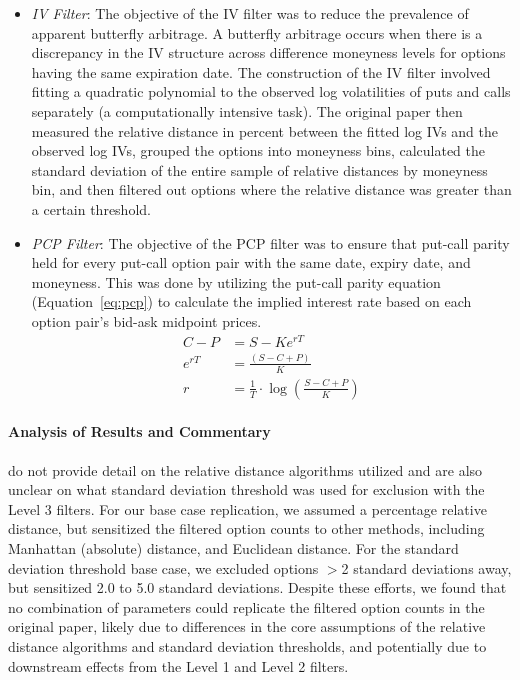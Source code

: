 \begin{itemize}
  \item \textit{IV Filter}: The objective of the IV filter was to reduce the prevalence of apparent butterfly arbitrage. A butterfly arbitrage occurs when there is a discrepancy in the IV structure across difference moneyness levels for options having the same expiration date. The construction of the IV filter involved fitting a quadratic polynomial to the observed log volatilities of puts and calls separately (a computationally intensive task). The original paper then measured the relative distance in percent between the fitted log IVs and the observed log IVs, grouped the options into moneyness bins, calculated the standard deviation of the entire sample of relative distances by moneyness bin, and then filtered out options where the relative distance was greater than a certain threshold.
  \item \textit{PCP Filter}: The objective of the PCP filter was to ensure that put-call parity held for every put-call option pair with the same date, expiry date, and moneyness. This was done by utilizing the put-call parity equation (Equation~\ref{eq:pcp}) to calculate the implied interest rate based on each option pair's bid-ask midpoint prices.
\begin{align}
  \label{eq:pcp}
  C-P &= S-Ke^{rT} \\
  e^{rT} &= \frac{(S-C+P)}{K} \\
  r &= \frac{1}{T} \cdot \log\left(\frac{S-C+P}{K}\right)
\end{align}
\end{itemize}


\paragraph{Analysis of Results and Commentary}
\citet{constantinides2013} do not provide detail on the relative distance algorithms utilized and are also unclear on what standard deviation threshold was used for exclusion with the Level 3 filters. For our base case replication, we assumed a percentage relative distance, but sensitized the filtered option counts to other methods, including Manhattan (absolute) distance, and Euclidean distance. For the standard deviation threshold base case, we excluded options $>$2 standard deviations away, but sensitized 2.0 to 5.0 standard deviations. Despite these efforts, we found that no combination of parameters could replicate the filtered option counts in the original paper, likely due to differences in the core assumptions of the relative distance algorithms and standard deviation thresholds, and potentially due to downstream effects from the Level 1 and Level 2 filters. 


